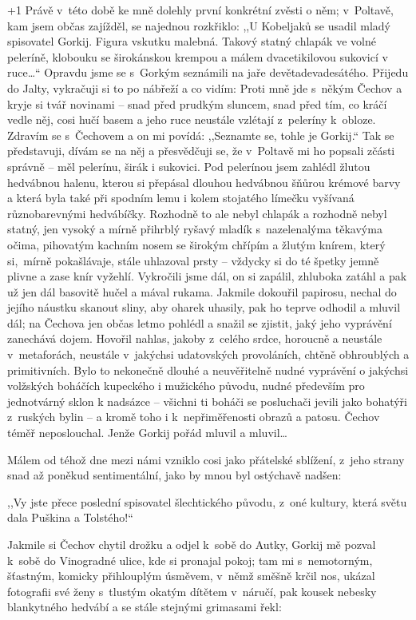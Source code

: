 \looseness+1
Právě v této době ke mně dolehly první konkrétní zvěsti o něm; v Poltavě, kam jsem občas zajížděl, se najednou rozkřiklo: ,,U Kobeljaků se usadil mladý spisovatel Gorkij. Figura vskutku malebná. Takový statný chlapák ve volné peleríně, klobouku se širokánskou krempou a málem dvacetikilovou sukovicí v ruce\ldots`` Opravdu jsme se s Gorkým seznámili na jaře devětadevadesátého. Přijedu do Jalty, vykračuji si to po nábřeží a co vidím: Proti mně jde s někým Čechov a kryje si tvář novinami -- snad před prudkým sluncem, snad před tím, co kráčí vedle něj, cosi hučí basem a jeho ruce neustále vzlétají z peleríny k obloze. Zdravím se s Čechovem a on mi povídá: ,,Seznamte se, tohle je Gorkij.`` Tak se představuji, dívám se na něj a přesvědčuji se, že v Poltavě mi ho popsali zčásti správně -- měl pelerínu, širák i sukovici. Pod pelerínou jsem zahlédl žlutou hedvábnou halenu, kterou si přepásal dlouhou hedvábnou šňůrou krémové barvy a která byla také při spodním lemu i kolem stojatého límečku vyšívaná různobarevnými hedvábíčky. Rozhodně to ale nebyl chlapák a rozhodně nebyl statný, jen vysoký a mírně přihrblý ryšavý mladík s nazelenalýma těkavýma očima, pihovatým kachním nosem se širokým chřípím a žlutým knírem, který si, mírně pokašlávaje, stále uhlazoval prsty -- vždycky si do té špetky jemně plivne a zase knír vyžehlí. Vykročili jsme dál, on si zapálil, zhluboka zatáhl a pak už jen dál basovitě hučel a mával rukama. Jakmile dokouřil papirosu, nechal do jejího náustku skanout sliny, aby oharek uhasily, pak ho teprve odhodil a mluvil dál; na Čechova jen občas letmo pohlédl a snažil se zjistit, jaký jeho vyprávění zanechává dojem. Hovořil nahlas, jakoby z celého srdce, horoucně a neustále v metaforách, neustále v jakýchsi udatovských provoláních, chtěně obhroublých a primitivních. Bylo to nekonečně dlouhé a neuvěřitelně nudné vyprávění o jakýchsi volžských boháčích kupeckého i mužického původu, nudné především pro jednotvárný sklon k nadsázce -- všichni ti boháči se posluchači jevili jako bohatýři z ruských bylin -- a kromě toho i k nepřiměřenosti obrazů a patosu. Čechov téměř neposlouchal. Jenže Gorkij pořád mluvil a mluvil\ldots

Málem od téhož dne mezi námi vzniklo cosi jako přátelské sblížení, z jeho strany snad až poněkud sentimentální, jako by mnou byl ostýchavě nadšen:

,,Vy jste přece poslední spisovatel šlechtického původu, z oné kultury, která světu dala Puškina a Tolstého!``

Jakmile si Čechov chytil drožku a odjel k sobě do Autky, Gorkij mě pozval k sobě do Vinogradné ulice, kde si pronajal pokoj; tam mi s nemotorným, šťastným, komicky přihlouplým úsměvem, v němž směšně krčil nos, ukázal fotografii své ženy s tlustým okatým dítětem v náručí, pak kousek nebesky blankytného hedvábí a se stále stejnými grimasami řekl:

